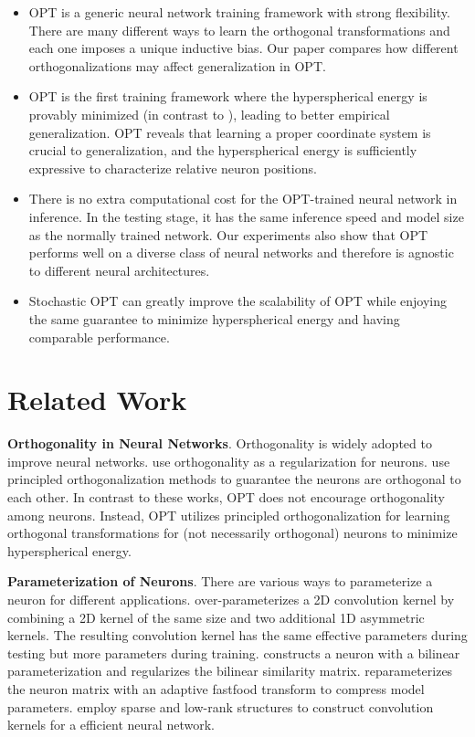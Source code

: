 \begin{itemize}[leftmargin=*,nosep,nolistsep]
    \item OPT is a generic neural network training framework with strong flexibility. There are many different ways to learn the orthogonal transformations and each one imposes a unique inductive bias. Our paper compares how different orthogonalizations may affect generalization in OPT.
    \item OPT is the first training framework where the hyperspherical energy is provably minimized (in contrast to \cite{liu2018learning}), leading to better empirical generalization. OPT reveals that learning a proper coordinate system is crucial to generalization, and the hyperspherical energy is sufficiently expressive to characterize relative neuron positions.
    \item There is no extra computational cost for the OPT-trained neural network in inference. In the testing stage, it has the same inference speed and model size as the normally trained network. Our experiments also show that OPT performs well on a diverse class of neural networks and therefore is agnostic to different neural architectures.
    \item Stochastic OPT can greatly improve the scalability of OPT while enjoying the same guarantee to minimize hyperspherical energy and having comparable performance.
\end{itemize}

\section{Related Work}

\textbf{Orthogonality in Neural Networks}. Orthogonality is widely adopted to improve neural networks. \cite{bansal2018can,liu2017deep,brock2016neural,huang2020controllable,xie2017all} use orthogonality as a regularization for neurons. \cite{huang2018orthogonal,lezcano2019cheap,arjovsky2016unitary,wisdom2016full,qi2020deep,jia2019orthogonal} use principled orthogonalization methods to guarantee the neurons are orthogonal to each other. In contrast to these works, OPT does not encourage orthogonality among neurons. Instead, OPT utilizes principled orthogonalization for learning orthogonal transformations for (not necessarily orthogonal) neurons to minimize hyperspherical energy.

\par

\textbf{Parameterization of Neurons}. There are various ways to parameterize a neuron for different applications. \cite{ding2019acnet} over-parameterizes a 2D convolution kernel by combining a 2D kernel of the same size and two additional 1D asymmetric kernels. The resulting convolution kernel has the same effective parameters during testing but more parameters during training. \cite{liu2019neural} constructs a neuron with a bilinear parameterization and regularizes the bilinear similarity matrix. \cite{yang2015deep} reparameterizes the neuron matrix with an adaptive fastfood transform to compress model parameters. \cite{jaderberg2014speeding,liu2015sparse,wang2017factorized} employ sparse and low-rank structures to construct convolution kernels for a efficient neural network. 

